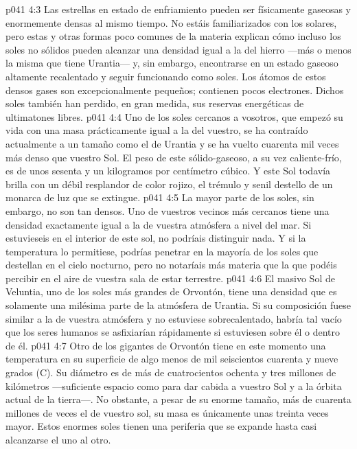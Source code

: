 \vs p041 4:3 \pc Las estrellas en estado de enfriamiento pueden ser físicamente gaseosas y enormemente densas al mismo tiempo. No estáis familiarizados con los  solares, pero estas y otras formas poco comunes de la materia explican cómo incluso los soles no sólidos pueden alcanzar una densidad igual a la del hierro ---más o menos la misma que tiene Urantia--- y, sin embargo, encontrarse en un estado gaseoso altamente recalentado y seguir funcionando como soles. Los átomos de estos densos gases son excepcionalmente pequeños; contienen pocos electrones. Dichos soles también han perdido, en gran medida, sus reservas energéticas de ultimatones libres.
\vs p041 4:4 Uno de los soles cercanos a vosotros, que empezó su vida con una masa prácticamente igual a la del vuestro, se ha contraído actualmente a un tamaño como el de Urantia y se ha vuelto cuarenta mil veces más denso que vuestro Sol. El peso de este sólido\hyp{}gaseoso, a su vez caliente\hyp{}frío, es de unos sesenta y un kilogramos por centímetro cúbico. Y este Sol todavía brilla con un débil resplandor de color rojizo, el trémulo y senil destello de un monarca de luz que se extingue.
\vs p041 4:5 La mayor parte de los soles, sin embargo, no son tan densos. Uno de vuestros vecinos más cercanos tiene una densidad exactamente igual a la de vuestra atmósfera a nivel del mar. Si estuvieseis en el interior de este sol, no podríais distinguir nada. Y si la temperatura lo permitiese, podrías penetrar en la mayoría de los soles que destellan en el cielo nocturno, pero no notaríais más materia que la que podéis percibir en el aire de vuestra sala de estar terrestre.
\vs p041 4:6 El masivo Sol de Veluntia, uno de los soles más grandes de Orvontón, tiene una densidad que es solamente una milésima parte de la atmósfera de Urantia. Si su composición fuese similar a la de vuestra atmósfera y no estuviese sobrecalentado, habría tal vacío que los seres humanos se asfixiarían rápidamente si estuviesen sobre él o dentro de él.
\vs p041 4:7 Otro de los gigantes de Orvontón tiene en este momento una temperatura en su superficie de algo menos de mil seiscientos cuarenta y nueve grados (C). Su diámetro es de más de cuatrocientos ochenta y tres millones de kilómetros ---suficiente espacio como para dar cabida a vuestro Sol y a la órbita actual de la tierra---. No obstante, a pesar de su enorme tamaño, más de cuarenta millones de veces el de vuestro sol, su masa es únicamente unas treinta veces mayor. Estos enormes soles tienen una periferia que se expande hasta casi alcanzarse el uno al otro.
